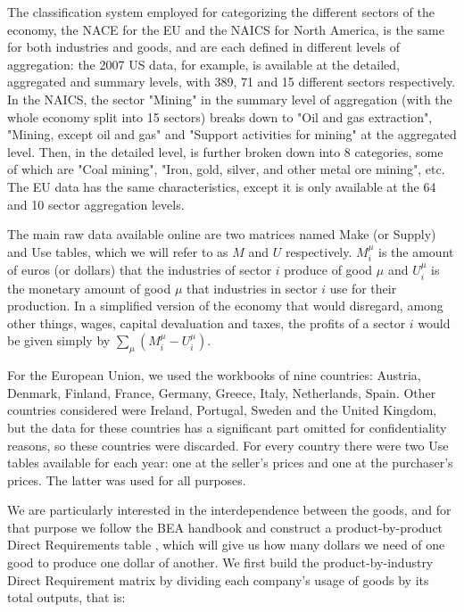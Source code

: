 The classification system employed for categorizing the different sectors of the economy, the NACE for the EU and the NAICS for North America, is the
same for both industries and goods, and are each defined in different levels of
aggregation: the 2007 US data, for example, is available at the
detailed, aggregated and summary levels, with 389, 71 and 15 different
sectors respectively. In the NAICS, the sector "Mining" in the summary level of aggregation (with the whole economy split into 15 sectors) breaks down to "Oil and gas extraction", "Mining, except oil and gas" and "Support activities for mining" at the aggregated level. Then, in the detailed level, is further broken down into 8 categories, some of which are "Coal mining", "Iron, gold, silver, and other metal ore mining", etc. The EU data has the same characteristics, except it is only available at the 64 and 10 sector aggregation levels.

The main raw data available online \cite{bea_data, eurostate_data} are two matrices named Make (or Supply) and Use tables,
which we will refer to as $M$ and $U$ respectively. $M_i^\mu$ is the
amount of euros (or dollars) that the industries of sector $i$ produce
of good $\mu$ and $U_i^\mu$ is the monetary amount of good $\mu$ that
industries in sector $i$ use for their production. In a simplified version of the
economy that would disregard, among other things, wages, capital
devaluation and taxes, the profits of a sector $i$ would be given
simply by $\sum_\mu (M_i^\mu - U_i^\mu)$.

For the European Union, we used the workbooks of
nine countries: Austria, Denmark, Finland, France, Germany, Greece,
Italy, Netherlands, Spain. Other countries considered were
Ireland, Portugal, Sweden and the United Kingdom, but the data for
these countries has a significant part omitted for
confidentiality reasons, so these countries were discarded. For every country there were two Use tables available for each year:
one at the seller's prices and one at the purchaser's prices. The latter was used for all purposes.

We are particularly interested in the interdependence between the goods,
and for that purpose we follow the BEA handbook and construct a product-by-product Direct Requirements table
\cite{BEA_handbook}, which will give us how many dollars we need of
one good to produce one dollar of another. We first build the product-by-industry Direct Requirement matrix by
dividing each company's usage of goods by its total outputs, that is:

